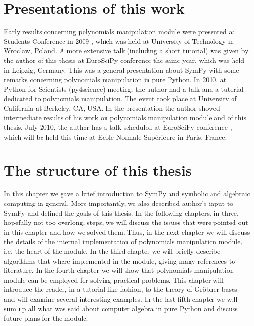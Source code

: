 \section{Presentations of this work}

Early results concerning polynomials manipulation module were presented at Students Conference in
2009 \cite{KNS2009}, which was held at University of Technology in Wrocław, Poland. A more extensive
talk (including a short tutorial) was given by the author of this thesis at EuroSciPy conference
\cite{EuroSciPy2009} the same year, which was held in Leipzig, Germany. This was a general presentation
about SymPy with some remarks concerning polynomials manipulation in pure Python. In 2010, at Python
for Scientists (py4science) meeting, the author had a talk and a tutorial \cite{py4science2010} dedicated
to polynomials manipulation. The event took place at University of California at Berkeley, CA, USA. In
the presentation the author showed intermediate results of his work on polynomials manipulation module
and of this thesis. July 2010, the author has a talk scheduled at EuroSciPy conference \cite{EuroSciPy2010},
which will be held this time at Ecole Normale Supérieure in Paris, France.


\section{The structure of this thesis}

In this chapter we gave a brief introduction to SymPy and symbolic and algebraic computing in general.
More importantly, we also described author's input to SymPy and defined the goals of this thesis. In
the following chapters, in three, hopefully not too overlong, steps, we will discuss the issues that
were pointed out in this chapter and how we solved them. Thus, in the next chapter we will discuss
the details of the internal implementation of polynomials manipulation module, i.e. the heart of the
module. In the third chapter we will briefly describe algorithms that where implemented in the module,
giving many references to literature. In the fourth chapter we will show that polynomials manipulation
module can be employed for solving practical problems. This chapter will introduce the reader, in a
tutorial like fashion, to the theory of Gröbner bases and will examine several interesting examples.
In the last fifth chapter we will sum up all what was said about computer algebra in pure Python and
discuss future plans for the module.



